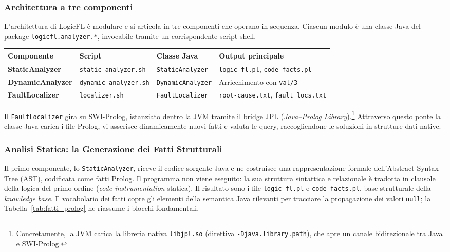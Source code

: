 \subsubsection{Architettura a tre componenti}
L'architettura di LogicFL è modulare e si articola in tre componenti che operano in sequenza. Ciascun
modulo è una classe Java del package \texttt{logicfl.analyzer.*}, invocabile tramite un corrispondente script shell.
\begin{table}[H]
\centering
\small
\begin{tabularx}{\textwidth}{@{}l l l >{\raggedright\arraybackslash}X@{}}
\toprule
\textbf{Componente} & \textbf{Script} & \textbf{Classe Java} & \textbf{Output principale} \\
\midrule
\textbf{StaticAnalyzer} & \texttt{static\_analyzer.sh} & \texttt{StaticAnalyzer} & \texttt{logic-fl.pl}, \texttt{code-facts.pl} \\
\textbf{DynamicAnalyzer} & \texttt{dynamic\_analyzer.sh} & \texttt{DynamicAnalyzer} & Arricchimento con \texttt{val/3} \\
\textbf{FaultLocalizer} & \texttt{localizer.sh} & \texttt{FaultLocalizer} & \texttt{root-cause.txt}, \texttt{fault\_locs.txt} \\
\bottomrule
\end{tabularx}
\end{table}

Il \texttt{FaultLocalizer} gira su SWI-Prolog, istanziato dentro la JVM tramite il bridge JPL
(\textit{Java--Prolog Library}).\footnote{Concretamente, la JVM carica la libreria nativa \texttt{libjpl.so}
(direttiva \texttt{-Djava.library.path}), che apre un canale bidirezionale tra Java e SWI-Prolog.} Attraverso
questo ponte la classe Java carica i file Prolog, vi asserisce dinamicamente nuovi fatti e valuta le query,
raccogliendone le soluzioni in strutture dati native.

\subsubsection{Analisi Statica: la Generazione dei Fatti Strutturali}

Il primo componente, lo \texttt{StaticAnalyzer}, riceve il codice sorgente Java e ne costruisce una
rappresentazione formale dell'Abstract Syntax Tree (AST), codificata come fatti Prolog. Il programma non
viene eseguito: la sua struttura sintattica e relazionale è tradotta in clausole della logica del primo ordine
(\textit{code instrumentation} statica). Il risultato sono i file \texttt{logic-fl.pl} e \texttt{code-facts.pl}, base
strutturale della \textit{knowledge base}. Il vocabolario dei fatti copre gli elementi della semantica Java
rilevanti per tracciare la propagazione dei valori \texttt{null}; la Tabella~\ref{tab:fatti_prolog} ne riassume
i blocchi fondamentali.


